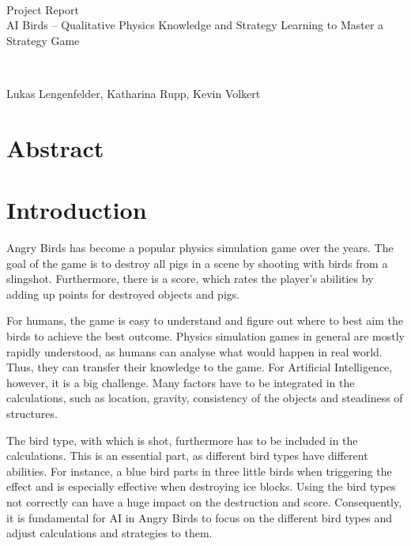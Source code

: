 \documentclass[a4paper, pdftex, ngerman]{article}
\begin{document}
\bigskip
\bigskip
\bigskip
\bigskip
~\vfill



\begin{center}
\huge Project Report\\
\bigskip
\large AI Birds – Qualitative Physics Knowledge and Strategy Learning to Master a Strategy Game
\end{center}

\vfill~

Lukas Lengenfelder, Katharina Rupp, Kevin Volkert

\newpage


\section{Abstract}


\newpage

\normalsize
\tableofcontents

\newpage

\listoftables

\newpage

\section{Introduction}
Angry Birds has become a popular physics simulation game over the years. The goal of the game is to destroy all pigs in a scene by shooting with birds from a slingshot. Furthermore, there is a score, which rates the player's abilities by adding up points for destroyed objects and pigs.

For humans, the game is easy to understand and figure out where to best aim the birds to achieve the best outcome. Physics simulation games in general are mostly rapidly understood, as humans can analyse what would happen in real world. Thus, they can transfer their knowledge to the game. For Artificial Intelligence, however, it is a big challenge. Many factors have to be integrated in the calculations, such as location, gravity, consistency of the objects and steadiness of structures. 

The bird type, with which is shot, furthermore has to be included in the calculations. This is an essential part, as different bird types have different abilities. For instance, a blue bird parts in three little birds when triggering the effect and is especially effective when destroying ice blocks. Using the bird types not correctly can have a huge impact on the destruction and score. Consequently, it is fundamental for AI in Angry Birds to focus on the different bird types and adjust calculations and strategies to them.
\end{document}
